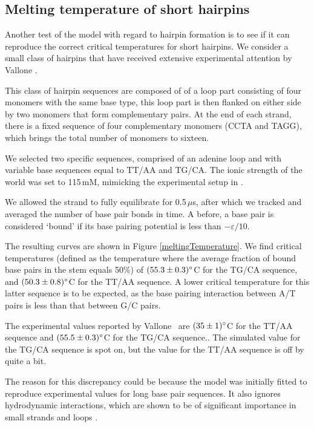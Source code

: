 \subsection{Melting temperature of short hairpins}

Another test of the model with regard to hairpin formation is to see if it can reproduce the correct critical temperatures for short hairpins. We consider a small class of hairpins that have received extensive experimental attention by Vallone \etal \cite{vallone1999melting}.

This class of hairpin sequences are composed of of a loop part consisting of four monomers with the same base type, this loop part is then flanked on either side by two monomers that form complementary pairs. At the end of each strand, there is a fixed sequence of four complementary monomers (CCTA and TAGG), which brings the total number of monomers to sixteen.

We selected two specific sequences, comprised of an adenine loop and with variable base sequences equal to TT/AA and TG/CA. The ionic strength of the world was set to 115\,mM, mimicking the experimental setup in \cite{vallone1999melting}.

We allowed the strand to fully equilibrate for 0.5\,$\mu$s, after which we tracked and averaged the number of base pair bonds in time. A before, a base pair is considered `bound' if its base pairing potential is less than $-\varepsilon / 10$.





The resulting curves are shown in Figure \ref{meltingTemperature}. We find critical temperatures (defined as the temperature where the average fraction of bound base pairs in the stem equals 50\%) of $(55.3 \pm 0.3)^{\circ}$C for the TG/CA sequence, and $(50.3 \pm 0.8)^{\circ}$C for the TT/AA sequence. A lower critical temperature for this latter sequence is to be expected, as the base pairing interaction between A/T pairs is less than that between G/C pairs.

The experimental values reported by Vallone \etal\ are $(35 \pm 1)^{\circ}$C for the TT/AA sequence and $(55.5 \pm 0.3)^{\circ}$C for the TG/CA sequence.\cite{vallone1999melting}. The simulated value for the TG/CA sequence is spot on, but the value for the TT/AA sequence is off by quite a bit.

The reason for this discrepancy could be because the model was initially fitted to reproduce experimental values for long base pair sequences. It also ignores hydrodynamic interactions, which are shown to be of significant importance in small strands and loops \cite{kuznetsov2001semiflexible}.

